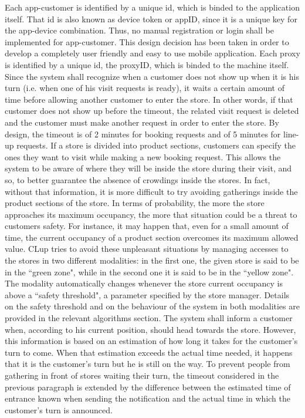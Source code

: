 \documentclass[a4paper,oneside,11pt]{book}
\begin{document}
    Each app-customer is identified by a unique id, which is binded to the application itself. That id is also known as device token or appID, since it is a unique key for the app-device combination. Thus, no manual registration or login shall be implemented for app-customer. This design decision has been taken in order to develop a completely user friendly and easy to use mobile application. \newline\newline
    Each proxy is identified by a unique id, the proxyID, which is binded to the machine itself. \newline\newline
    Since the system shall recognize when a customer does not show up when it is his turn (i.e. when one of his visit requests is ready), it waits a certain amount of time before allowing another customer to enter the store. In other words, if that customer does not show up before the timeout, the related visit request is deleted and the customer must make another request in order to enter the store. By design, the timeout is of 2 minutes for booking requests and of 5 minutes for line-up requests. \newline\newline
    If a store is divided into product sections, customers can specify the ones they want to visit while making a new booking request. This allows the system to be aware of where they will be inside the store during their visit, and so, to better guarantee the absence of crowdings inside the stores. In fact, without that information, it is more difficult to try avoiding gatherings inside the product sections of the store. In terms of probability, the more the store approaches its maximum occupancy, the more that situation could be a threat to customers safety. For instance, it may happen that, even for a small amount of time, the current occupancy of a product section overcomes its maximum allowed value. CLup tries to avoid these unpleasant situations by managing accesses to the stores in two different modalities: in the first one, the given store is said to be in the ``green zone", while in the second one it is said to be in the ``yellow zone". The modality automatically changes whenever the store current occupancy is above a ``safety threshold", a parameter specified by the store manager. Details on the safety threshold and on the behaviour of the system in both modalities are provided in the relevant algorithms section. \newline\newline
    The system shall inform a customer when, according to his current position, should head towards the store. However, this information is based on an estimation of how long it takes for the customer’s turn to come. When that estimation exceeds the actual time needed, it happens that it is the customer’s turn but he is still on the way. To prevent people from gathering in front of stores waiting their turn, the timeout considered in the previous paragraph is extended by the difference between the estimated time of entrance known when sending the notification and the actual time in which the customer’s turn is announced. 
    
\end{document}
